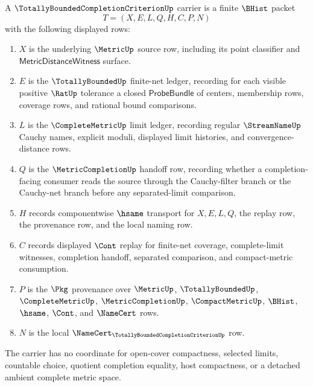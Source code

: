 \begin{definition}
\label{def:totally-bounded-completion-criterion-carrier}
A $\TotallyBoundedCompletionCriterionUp$ carrier is a finite $\BHist$ packet
$$
T=(X,E,L,Q,H,C,P,N)
$$
with the following displayed rows:
\begin{enumerate}
\item $X$ is the underlying $\MetricUp$ source row, including its point classifier and $\mathsf{MetricDistanceWitness}$ surface.
\item $E$ is the $\TotallyBoundedUp$ finite-net ledger, recording for each visible positive $\RatUp$ tolerance a closed $\mathsf{ProbeBundle}$ of centers, membership rows, coverage rows, and rational bound comparisons.
\item $L$ is the $\CompleteMetricUp$ limit ledger, recording regular $\StreamNameUp$ Cauchy names, explicit moduli, displayed limit histories, and convergence-distance rows.
\item $Q$ is the $\MetricCompletionUp$ handoff row, recording whether a completion-facing consumer reads the source through the Cauchy-filter branch or the Cauchy-net branch before any separated-limit comparison.
\item $H$ records componentwise $\hsame$ transport for $X,E,L,Q$, the replay row, the provenance row, and the local naming row.
\item $C$ records displayed $\Cont$ replay for finite-net coverage, complete-limit witnesses, completion handoff, separated comparison, and compact-metric consumption.
\item $P$ is the $\Pkg$ provenance over $\MetricUp$, $\TotallyBoundedUp$, $\CompleteMetricUp$, $\MetricCompletionUp$, $\CompactMetricUp$, $\BHist$, $\hsame$, $\Cont$, and $\NameCert$ rows.
\item $N$ is the local $\NameCert_{\TotallyBoundedCompletionCriterionUp}$ row.
\end{enumerate}
The carrier has no coordinate for open-cover compactness, selected limits, countable choice, quotient completion equality, host compactness, or a detached ambient complete metric space.
\end{definition}

